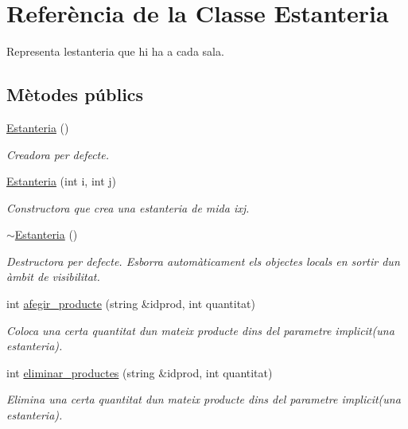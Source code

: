 \hypertarget{class_estanteria}{}\section{Referència de la Classe Estanteria}
\label{class_estanteria}


Representa l\textquotesingle{}estanteria que hi ha a cada sala.  


\subsection*{Mètodes públics}
\begin{DoxyCompactItemize}
\item 
\hyperlink{class_estanteria_a55c7a4e067b17ba7e79f61ce8929ac88}{Estanteria} ()
\begin{DoxyCompactList}\small\item\em Creadora per defecte. \end{DoxyCompactList}\item 
\hyperlink{class_estanteria_ab0593879a794013eb05ee0b3b61dfd54}{Estanteria} (int i, int j)
\begin{DoxyCompactList}\small\item\em Constructora que crea una estanteria de mida ixj. \end{DoxyCompactList}\item 
\hyperlink{class_estanteria_a4d7827dbb58db685a34b305b6ff8e755}{$\sim$\+Estanteria} ()
\begin{DoxyCompactList}\small\item\em Destructora per defecte. Esborra automàticament els objectes locals en sortir d\textquotesingle{}un àmbit de visibilitat. \end{DoxyCompactList}\item 
int \hyperlink{class_estanteria_a8ab96b52673441f441cec50fb8e9378e}{afegir\+\_\+producte} (string \&idprod, int quantitat)
\begin{DoxyCompactList}\small\item\em Coloca una certa quantitat d\textquotesingle{}un mateix producte dins del parametre implicit(una estanteria). \end{DoxyCompactList}\item 
int \hyperlink{class_estanteria_a19a5ab5427f1ded37722fc071e87ef41}{eliminar\+\_\+productes} (string \&idprod, int quantitat)
\begin{DoxyCompactList}\small\item\em Elimina una certa quantitat d\textquotesingle{}un mateix producte dins del parametre implicit(una estanteria). \end{DoxyCompactList}\item 

\end{DoxyCompactItemize}
